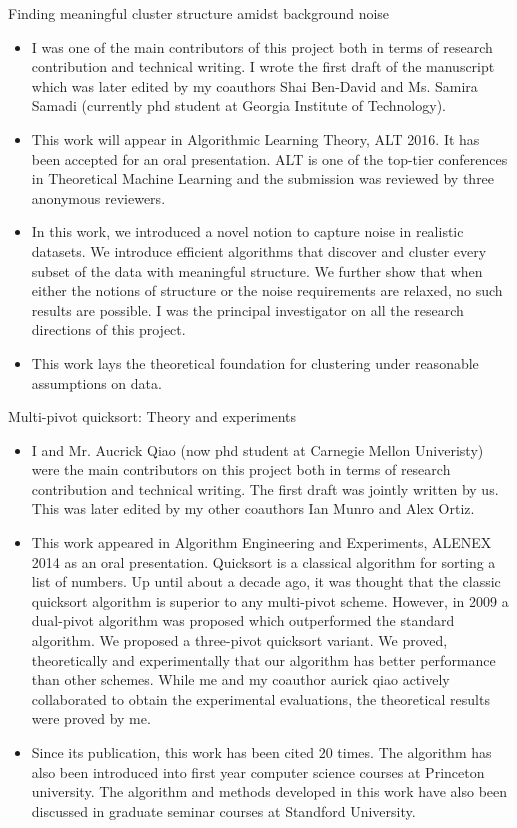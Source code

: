 \documentclass[12pt]{article}
\begin{document}
\vspace{0.15in}\noindent Finding meaningful cluster structure amidst background noise
\begin{itemize}[noitemsep]
\item I was one of the main contributors of this project both in terms of research contribution and technical writing. I wrote the first draft of the manuscript which was later edited by my coauthors Shai Ben-David and Ms. Samira Samadi (currently phd student at Georgia Institute of Technology). 
\item This work will appear in Algorithmic Learning Theory, ALT 2016. It has been accepted for an oral presentation. ALT is one of the top-tier conferences in Theoretical Machine Learning and the submission was reviewed by three anonymous reviewers.
\item In this work, we introduced a novel notion to capture noise in realistic datasets. We introduce efficient algorithms that discover and cluster every subset of the data with meaningful structure. We further show that when either the notions of structure or the noise requirements are relaxed, no such results are possible. I was the principal investigator on all the research directions of this project. 
\item This work lays the theoretical foundation for clustering under reasonable assumptions on data. 
\end{itemize}

\vspace{0.15in}\noindent Multi-pivot quicksort: Theory and experiments
\begin{itemize}[noitemsep]
\item I and Mr. Aucrick Qiao (now phd student at Carnegie Mellon Univeristy) were the main contributors on this project both in terms of research contribution and technical writing. The first draft was jointly written by us. This was later edited by my other coauthors Ian Munro and Alex Ortiz. 
\item This work appeared in Algorithm Engineering and Experiments, ALENEX 2014 as an oral presentation. Quicksort is a classical algorithm for sorting a list of numbers. Up until about a decade ago, it was thought that the classic quicksort algorithm is superior to any multi-pivot scheme. However, in 2009 a dual-pivot algorithm was proposed which outperformed the standard algorithm. We proposed a three-pivot quicksort variant. We proved, theoretically and experimentally that our algorithm has better performance than other schemes. While me and my coauthor aurick qiao actively collaborated to obtain the experimental evaluations, the theoretical results were proved by me.
\item Since its publication, this work has been cited $20$ times. The algorithm has also been introduced into first year computer science courses at Princeton university. The algorithm and methods developed in this work have also been discussed in graduate seminar courses at Standford University. 
\end{itemize}
\end{document}
